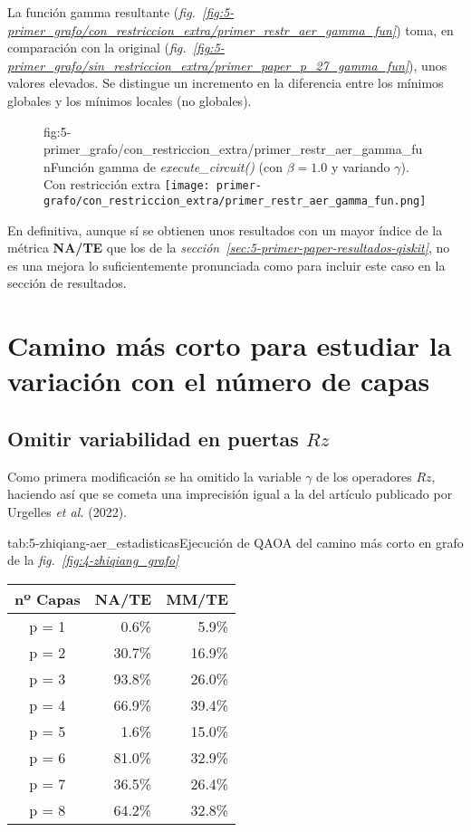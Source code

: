 La función gamma resultante (\textit{fig.~\ref{fig:5-primer_grafo/con_restriccion_extra/primer_restr_aer_gamma_fun}}) toma, en comparación con la original (\textit{fig.~\ref{fig:5-primer_grafo/sin_restriccion_extra/primer_paper_p_27_gamma_fun}}), unos valores elevados.
Se distingue un incremento en la diferencia entre los mínimos globales y los mínimos locales (no globales).

\begin{figure}[Resultados QAOA {--} artículo de Fan \textit{et al.} (2023) {--} función gamma con restricción extra]{fig:5-primer_grafo/con_restriccion_extra/primer_restr_aer_gamma_fun}{Función gamma de \textit{execute\_circuit()} (con $\beta = 1.0$ y variando $\gamma$). Con restricción extra}
  \centering
  \texttt{[image: primer-grafo/con\_restriccion\_extra/primer\_restr\_aer\_gamma\_fun.png]}
\end{figure}

En definitiva, aunque sí se obtienen unos resultados con un mayor índice de la métrica \textbf{NA/TE} que los de la \textit{sección~\ref{sec:5-primer-paper-resultados-qiskit}}, no es una mejora lo suficientemente pronunciada como para incluir este caso en la sección de resultados.


\section{Camino más corto para estudiar la variación con el número de capas\label{sec:8-zhiqiang}}

\subsection{Omitir variabilidad en puertas $Rz$}

Como primera modificación se ha omitido la variable $\gamma$ de los operadores $Rz$, haciendo así que se cometa una imprecisión igual a la del artículo publicado por Urgelles \textit{et al.} (2022)\cite{multi-objective_routing_optimization}.

\begin{table}[Resultados QAOA {--} artículo de Fan \textit{et al.} (2023) {--} puertas $Rz$ constantes]{tab:5-zhiqiang-aer_estadisticas}{Ejecución de QAOA del camino más corto en grafo de la \textit{fig.~\ref{fig:4-zhiqiang_grafo}}}
  \centering
  \begin{tabular}{|c|r|r|}
    \hline
    \textbf{nº Capas} & \textbf{NA/TE} & \textbf{MM/TE} \\ \hline
    p = 1 &  0.6\% &  5.9\% \\ \hline
    p = 2 & 30.7\% & 16.9\% \\ \hline
    p = 3 & 93.8\% & 26.0\% \\ \hline
    p = 4 & 66.9\% & 39.4\% \\ \hline
    p = 5 &  1.6\% & 15.0\% \\ \hline
    p = 6 & 81.0\% & 32.9\% \\ \hline
    p = 7 & 36.5\% & 26.4\% \\ \hline
    p = 8 & 64.2\% & 32.8\% \\ \hline
  \end{tabular}
\end{table}

